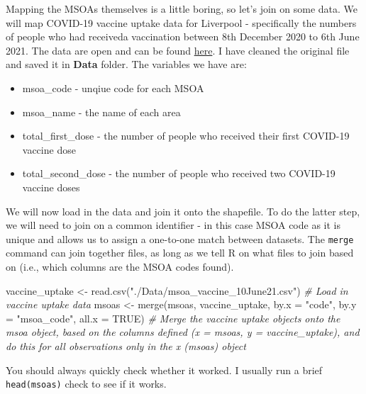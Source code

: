 \documentclass[
]{book}
\newenvironment{Shaded}{\begin{snugshade}}{\end{snugshade}}
\newcommand{\AttributeTok}[1]{\textcolor[rgb]{0.77,0.63,0.00}{#1}}
\newcommand{\CommentTok}[1]{\textcolor[rgb]{0.56,0.35,0.01}{\textit{#1}}}
\newcommand{\ConstantTok}[1]{\textcolor[rgb]{0.00,0.00,0.00}{#1}}
\newcommand{\FunctionTok}[1]{\textcolor[rgb]{0.00,0.00,0.00}{#1}}
\newcommand{\NormalTok}[1]{#1}
\newcommand{\OtherTok}[1]{\textcolor[rgb]{0.56,0.35,0.01}{#1}}
\newcommand{\StringTok}[1]{\textcolor[rgb]{0.31,0.60,0.02}{#1}}
\providecommand{\tightlist}{%
  \setlength{\itemsep}{0pt}\setlength{\parskip}{0pt}}
\begin{document}
Mapping the MSOAs themselves is a little boring, so let's join on some data. We will map COVID-19 vaccine uptake data for Liverpool - specifically the numbers of people who had receiveda vaccination between 8th December 2020 to 6th June 2021. The data are open and can be found \href{https://www.england.nhs.uk/statistics/statistical-work-areas/covid-19-vaccinations/}{here}. I have cleaned the original file and saved it in \textbf{Data} folder. The variables we have are:

\begin{itemize}
\tightlist
\item
  msoa\_code - unqiue code for each MSOA
\item
  msoa\_name - the name of each area
\item
  total\_first\_dose - the number of people who received their first COVID-19 vaccine dose
\item
  total\_second\_dose - the number of people who received two COVID-19 vaccine doses
\end{itemize}

We will now load in the data and join it onto the shapefile. To do the latter step, we will need to join on a common identifier - in this case MSOA code as it is unique and allows us to assign a one-to-one match between datasets. The \texttt{merge} command can join together files, as long as we tell R on what files to join based on (i.e., which columns are the MSOA codes found).

\begin{Shaded}
\begin{Highlighting}[]
\NormalTok{vaccine\_uptake }\OtherTok{\textless{}{-}} \FunctionTok{read.csv}\NormalTok{(}\StringTok{"./Data/msoa\_vaccine\_10June21.csv"}\NormalTok{) }\CommentTok{\# Load in vaccine uptake data}
\NormalTok{msoas }\OtherTok{\textless{}{-}} \FunctionTok{merge}\NormalTok{(msoas, vaccine\_uptake, }\AttributeTok{by.x =} \StringTok{"code"}\NormalTok{, }\AttributeTok{by.y =} \StringTok{"msoa\_code"}\NormalTok{, }\AttributeTok{all.x =} \ConstantTok{TRUE}\NormalTok{) }\CommentTok{\# Merge the vaccine uptake objects onto the msoa object, based on the columns defined (x = msoas, y = vaccine\_uptake), and do this for all observations only in the x (msoas) object}
\end{Highlighting}
\end{Shaded}

You should always quickly check whether it worked. I usually run a brief \texttt{head(msoas)} check to see if it works.
\end{document}
